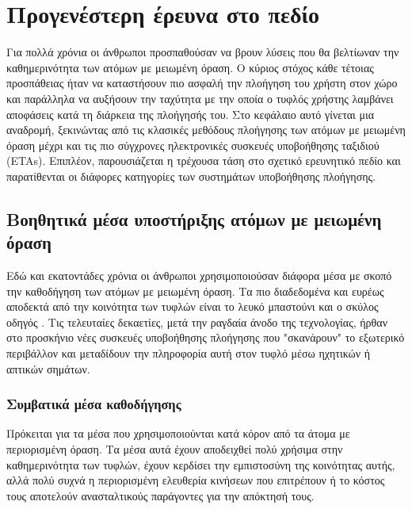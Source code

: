 \chapter{Προγενέστερη έρευνα στο πεδίο} \label{ch:state-of-the-art}

Για πολλά χρόνια οι άνθρωποι προσπαθούσαν να βρουν λύσεις που θα βελτίωναν την καθημερινότητα των ατόμων με μειωμένη όραση. Ο κύριος στόχος κάθε τέτοιας προσπάθειας ήταν να καταστήσουν πιο ασφαλή την πλοήγηση του χρήστη στον χώρο και παράλληλα να αυξήσουν την ταχύτητα με την οποία ο τυφλός χρήστης λαμβάνει αποφάσεις κατά τη διάρκεια της πλοήγησής του. Στο κεφάλαιο αυτό γίνεται μια αναδρομή, ξεκινώντας από τις κλασικές μεθόδους πλοήγησης των ατόμων με μειωμένη όραση μέχρι και τις πιο σύγχρονες ηλεκτρονικές συσκευές υποβοήθησης ταξιδιού (ETAs). Επιπλέον, παρουσιάζεται η τρέχουσα τάση στο σχετικό ερευνητικό πεδίο και παρατίθενται οι διάφορες κατηγορίες των συστημάτων υποβοήθησης πλοήγησης.

\section{Βοηθητικά μέσα υποστήριξης ατόμων με μειωμένη όραση}
Εδώ και εκατοντάδες χρόνια οι άνθρωποι χρησιμοποιούσαν διάφορα μέσα με σκοπό την καθοδήγηση των ατόμων με μειωμένη όραση. Τα πιο διαδεδομένα και ευρέως αποδεκτά από την κοινότητα των τυφλών είναι το λευκό μπαστούνι και ο σκύλος οδηγός \cite{social_sciences_libguides_nodate}. Τις τελευταίες δεκαετίες, μετά την ραγδαία άνοδο της τεχνολογίας, ήρθαν στο προσκήνιο νέες συσκευές υποβοήθησης πλοήγησης που "σκανάρουν" το εξωτερικό περιβάλλον και μεταδίδουν την πληροφορία αυτή στον τυφλό μέσω ηχητικών ή απτικών σημάτων.
\subsection{Συμβατικά μέσα καθοδήγησης}
Πρόκειται για τα μέσα που χρησιμοποιούνται κατά κόρον από τα άτομα με περιορισμένη όραση. Τα μέσα αυτά έχουν αποδειχθεί πολύ χρήσιμα στην καθημερινότητα των τυφλών, έχουν κερδίσει την εμπιστοσύνη της κοινότητας αυτής, αλλά πολύ συχνά η περιορισμένη ελευθερία κινήσεων που επιτρέπουν ή το κόστος τους αποτελούν ανασταλτικούς παράγοντες για την απόκτησή τους.
